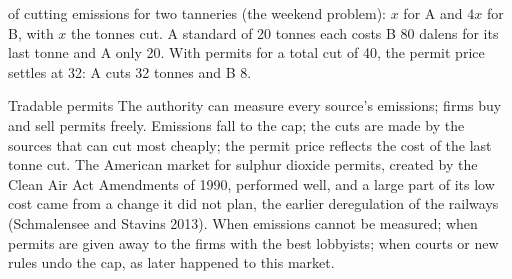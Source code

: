 \begin{omfigure}

{\small {} of cutting emissions for two tanneries (the weekend problem): $x$ for A and $4x$ for B, with $x$ the tonnes cut. A standard of 20 tonnes each
costs B 80 dalens for its last tonne and A only 20. With permits for a total cut of 40, the permit price settles at 32: A cuts 32 tonnes and B 8.}
\end{omfigure}

\begin{model}{Tradable permits}
\assumes The authority can measure every source's emissions; firms buy and sell permits freely.
\predicts Emissions fall to the cap; the cuts are made by the sources that can cut most cheaply; the permit price reflects the cost of the last tonne cut.
\tested The American market for sulphur dioxide permits, created by the Clean Air Act Amendments of 1990, performed well, and a large part of its low cost came from
  a change it did not plan, the earlier deregulation of the railways (Schmalensee and Stavins 2013).
\breaks When emissions cannot be measured; when permits are given away to the firms with the best lobbyists; when courts or new rules undo the cap, as later happened to
  this market.
\end{model}

